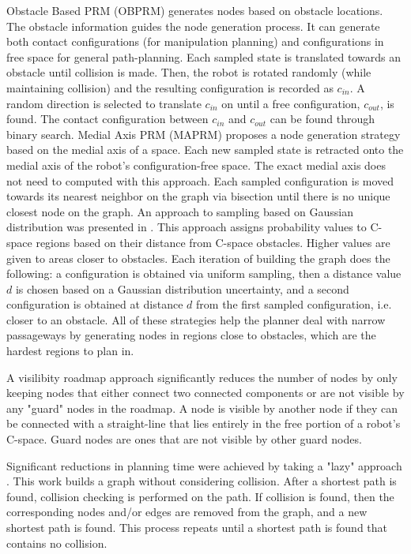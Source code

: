 \documentclass[10pt,conference]{ieeeconf}
\begin{document}
Obstacle Based PRM (OBPRM) \cite{amato1998obprm} generates nodes based on obstacle locations. The obstacle information guides the node generation process. It can generate both contact configurations (for manipulation planning) and configurations in free space for general path-planning. Each sampled state is translated towards an obstacle until collision is made. Then, the robot is rotated randomly (while maintaining collision) and the resulting configuration is recorded as $c_{in}$. A random direction is selected to translate $c_{in}$ on until a free configuration, $c_{out}$, is found. The contact configuration between $c_{in}$ and $c_{out}$ can be found through binary search.
Medial Axis PRM (MAPRM) \cite{wilmarth1999maprm} proposes a node generation strategy based on the medial axis of a space. Each new sampled state is retracted onto the medial axis of the robot's configuration-free space. The exact medial axis does not need to computed with this approach. Each sampled configuration is moved towards its nearest neighbor on the graph via bisection until there is no unique closest node on the graph. An approach to sampling based on Gaussian distribution was presented in \cite{boor1999gaussian}. This approach assigns probability values to C-space regions based on their distance from C-space obstacles. Higher values are given to areas closer to obstacles. Each iteration of building the graph does the following: a configuration is obtained via uniform sampling, then a distance value $d$ is chosen based on a Gaussian distribution uncertainty, and a second configuration is obtained at distance $d$ from the first sampled configuration, i.e. closer to an obstacle. All of these strategies help the planner deal with narrow passageways by generating nodes in regions close to obstacles, which are the hardest regions to plan in.

A visilibity roadmap approach \cite{nissoux1999visibility} significantly reduces the number of nodes by only keeping nodes that either connect two connected components or are not visible by any "guard" nodes in the roadmap. A node is visible by another node if they can be connected with a straight-line that lies entirely in the free portion of a robot's C-space. Guard nodes are ones that are not visible by other guard nodes. 

Significant reductions in planning time were achieved by taking a "lazy" approach \cite{bohlin2000path}. This work builds a graph without considering collision. After a shortest path is found, collision checking is performed on the path. If collision is found, then the corresponding nodes and/or edges are removed from the graph, and a new shortest path is found. This process repeats until a shortest path is found that contains no collision.
\end{document}
